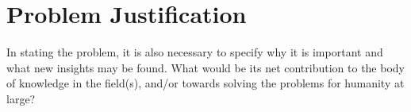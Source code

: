 \section{Problem Justification} \label{justification}

In stating the problem, it is also necessary to specify why it is important and
what new insights may be found. What would be its net contribution to the body
of knowledge in the field(s), and/or towards solving the problems for humanity
at large?
